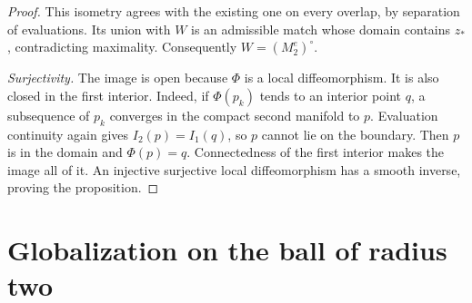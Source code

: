 \documentclass[11pt]{article}
\theoremstyle{definition}
\theoremstyle{remark}
\numberwithin{equation}{section}
\begin{document}
\begin{proof}
This isometry agrees with the existing one on every overlap, by
separation of evaluations. Its union with $W$ is an admissible
match whose domain contains $z_*$, contradicting maximality.
Consequently $W=(M_2^e)^\circ$.

\emph{Surjectivity.}\quad
The image is open because $\Phi$ is a local diffeomorphism. It is
also closed in the first interior. Indeed, if $\Phi(p_k)$ tends
to an interior point $q$, a subsequence of $p_k$ converges in
the compact second manifold to $p$. Evaluation continuity again
gives $I_2(p)=I_1(q)$, so $p$ cannot lie on the boundary. Then
$p$ is in the domain and $\Phi(p)=q$. Connectedness of the first
interior makes the image all of it. An injective surjective local
diffeomorphism has a smooth inverse, proving the proposition.
\end{proof}

\section{Globalization on the ball of radius two}
\label{bootstrap-expanded:global}
\end{document}
